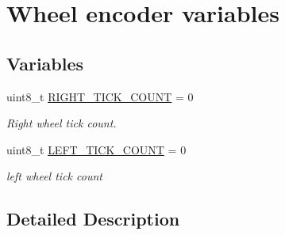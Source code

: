 \hypertarget{group__EncoderVariables}{}\section{Wheel encoder variables}
\label{group__EncoderVariables}
\subsection*{Variables}
\begin{DoxyCompactItemize}
\item 
uint8\+\_\+t \hyperlink{group__EncoderVariables_ga63bd10c23b8e1e359ccc54b26ddccf2b}{R\+I\+G\+H\+T\+\_\+\+T\+I\+C\+K\+\_\+\+C\+O\+U\+NT} = 0\hypertarget{group__EncoderVariables_ga63bd10c23b8e1e359ccc54b26ddccf2b}{}\label{group__EncoderVariables_ga63bd10c23b8e1e359ccc54b26ddccf2b}

\begin{DoxyCompactList}\small\item\em Right wheel tick count. \end{DoxyCompactList}\item 
uint8\+\_\+t \hyperlink{group__EncoderVariables_ga7b675fdfa3a53486da47f929c42ef4a8}{L\+E\+F\+T\+\_\+\+T\+I\+C\+K\+\_\+\+C\+O\+U\+NT} = 0\hypertarget{group__EncoderVariables_ga7b675fdfa3a53486da47f929c42ef4a8}{}\label{group__EncoderVariables_ga7b675fdfa3a53486da47f929c42ef4a8}

\begin{DoxyCompactList}\small\item\em left wheel tick count \end{DoxyCompactList}\end{DoxyCompactItemize}


\subsection{Detailed Description}
